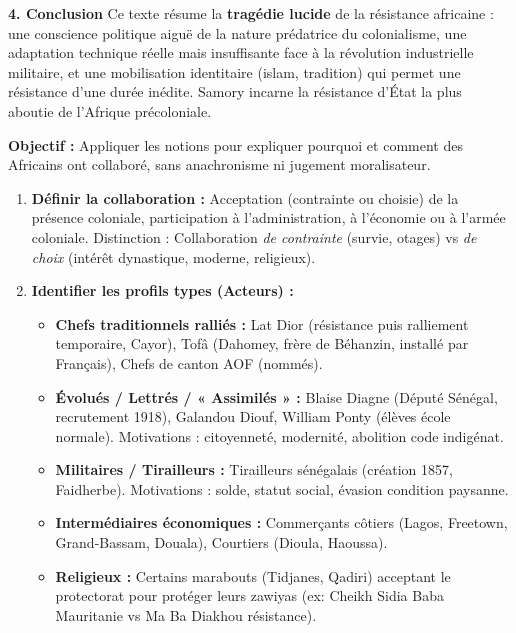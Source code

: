 \documentclass[11pt]{article}
\newcommand{\cle}[1]{{\popxbold\color{popdark}#1}}
\begin{document}
\begin{exoresolu}
\textbf{4. Conclusion}
Ce texte résume la \textbf{tragédie lucide} de la résistance africaine : une conscience politique aiguë de la nature prédatrice du colonialisme, une adaptation technique réelle mais insuffisante face à la révolution industrielle militaire, et une mobilisation identitaire (islam, tradition) qui permet une résistance d'une durée inédite. Samory incarne la \cle{résistance d'État} la plus aboutie de l'Afrique précoloniale.
\end{exoresolu}

\begin{methode}
\textbf{Objectif :} Appliquer les notions pour expliquer pourquoi et comment des Africains ont collaboré, sans anachronisme ni jugement moralisateur.
\begin{enumerate}
    \item \textbf{Définir la collaboration :} Acceptation (contrainte ou choisie) de la présence coloniale, participation à l'administration, à l'économie ou à l'armée coloniale. \cle{Distinction :} Collaboration \emph{de contrainte} (survie, otages) vs \emph{de choix} (intérêt dynastique, moderne, religieux).
    \item \textbf{Identifier les profils types (Acteurs) :}
        \begin{itemize}
            \item \textbf{Chefs traditionnels ralliés :} \cle{Lat Dior} (résistance puis ralliement temporaire, Cayor), \cle{Tofâ} (Dahomey, frère de Béhanzin, installé par Français), \cle{Chefs de canton AOF} (nommés).
            \item \textbf{Évolués / Lettrés / « Assimilés » :} \cle{Blaise Diagne} (Député Sénégal, recrutement 1918), \cle{Galandou Diouf}, \cle{William Ponty} (élèves école normale). Motivations : citoyenneté, modernité, abolition code indigénat.
            \item \textbf{Militaires / Tirailleurs :} \cle{Tirailleurs sénégalais} (création 1857, Faidherbe). Motivations : solde, statut social, évasion condition paysanne.
            \item \textbf{Intermédiaires économiques :} \cle{Commerçants côtiers} (Lagos, Freetown, Grand-Bassam, Douala), \cle{Courtiers} (Dioula, Haoussa).
            \item \textbf{Religieux :} Certains marabouts (Tidjanes, Qadiri) acceptant le protectorat pour protéger leurs zawiyas (ex: \cle{Cheikh Sidia Baba} Mauritanie vs \cle{Ma Ba Diakhou} résistance).

\end{itemize}
\end{enumerate}
\end{methode}
\end{document}
